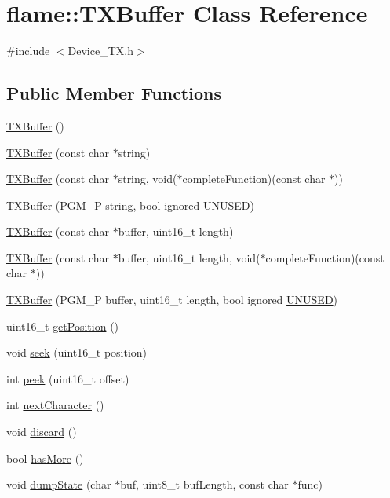 \hypertarget{classflame_1_1_t_x_buffer}{\section{flame\-:\-:T\-X\-Buffer Class Reference}
\label{classflame_1_1_t_x_buffer}
}


{\ttfamily \#include $<$Device\-\_\-\-T\-X.\-h$>$}

\subsection*{Public Member Functions}
\begin{DoxyCompactItemize}
\item 
\hyperlink{classflame_1_1_t_x_buffer_a98b938f8eb8bbc33578798a430a6f816}{T\-X\-Buffer} ()
\item 
\hyperlink{classflame_1_1_t_x_buffer_af0e3d3c373a5e75124636553561cecae}{T\-X\-Buffer} (const char $\ast$string)
\item 
\hyperlink{classflame_1_1_t_x_buffer_ad63b3d52cc78eb91a9780e1309e4e644}{T\-X\-Buffer} (const char $\ast$string, void($\ast$complete\-Function)(const char $\ast$))
\item 
\hyperlink{classflame_1_1_t_x_buffer_a873283b83ea650904d4f3ad1626b9775}{T\-X\-Buffer} (P\-G\-M\-\_\-\-P string, bool ignored \hyperlink{io_8h_addf5ec070e9499d36b7f2009ce736076}{U\-N\-U\-S\-E\-D})
\item 
\hyperlink{classflame_1_1_t_x_buffer_aaa616da48996dcb117a320a23b0b163b}{T\-X\-Buffer} (const char $\ast$buffer, uint16\-\_\-t length)
\item 
\hyperlink{classflame_1_1_t_x_buffer_ab13a5a50c65cff4aeccbe0406b792d8b}{T\-X\-Buffer} (const char $\ast$buffer, uint16\-\_\-t length, void($\ast$complete\-Function)(const char $\ast$))
\item 
\hyperlink{classflame_1_1_t_x_buffer_a6f294041f1bd3591e85b0cc78fb7b2b2}{T\-X\-Buffer} (P\-G\-M\-\_\-\-P buffer, uint16\-\_\-t length, bool ignored \hyperlink{io_8h_addf5ec070e9499d36b7f2009ce736076}{U\-N\-U\-S\-E\-D})
\item 
uint16\-\_\-t \hyperlink{classflame_1_1_t_x_buffer_ade3eba5c5ed688eb4ea132469c8e2307}{get\-Position} ()
\item 
void \hyperlink{classflame_1_1_t_x_buffer_ace94468f27c472f7515e7f355a1377af}{seek} (uint16\-\_\-t position)
\item 
int \hyperlink{classflame_1_1_t_x_buffer_a70668a72527ab1516088c38a8229337d}{peek} (uint16\-\_\-t offset)
\item 
int \hyperlink{classflame_1_1_t_x_buffer_aa6b30c699c035e69cd0ef2a009479206}{next\-Character} ()
\item 
void \hyperlink{classflame_1_1_t_x_buffer_a247c40701875dfaf8caa8d1cc25eb32a}{discard} ()
\item 
bool \hyperlink{classflame_1_1_t_x_buffer_a527cc3f0d2cb0519dc613c0832357c5e}{has\-More} ()
\item 
void \hyperlink{classflame_1_1_t_x_buffer_aef6d588530706d1436a2473d4814cb56}{dump\-State} (char $\ast$buf, uint8\-\_\-t buf\-Length, const char $\ast$func)
\end{DoxyCompactItemize}
